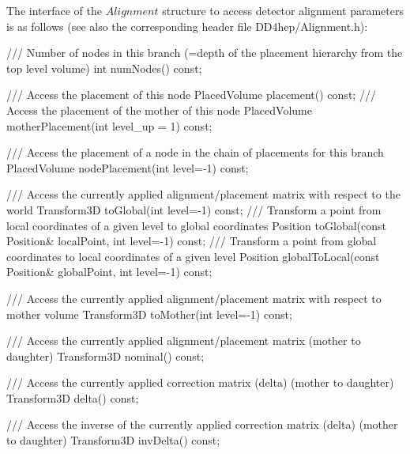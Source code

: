 \documentclass[10pt,a4paper]{article}
\begin{document}
\noindent
The interface of the $Alignment$ structure to access detector 
alignment parameters is as follows (see also the corresponding header file DD4hep/Alignment.h):
\begin{code}
      /// Number of nodes in this branch (=depth of the placement hierarchy from the top level volume)
      int numNodes() const;
      
      /// Access the placement of this node
      PlacedVolume placement()   const;
      /// Access the placement of the mother of this node
      PlacedVolume motherPlacement(int level_up = 1)   const;

      /// Access the placement of a node in the chain of placements for this branch
      PlacedVolume nodePlacement(int level=-1)   const;

      /// Access the currently applied alignment/placement matrix with respect to the world
      Transform3D toGlobal(int level=-1) const;
      /// Transform a point from local coordinates of a given level to global coordinates
      Position toGlobal(const Position& localPoint, int level=-1) const;
      /// Transform a point from global coordinates to local coordinates of a given level
      Position globalToLocal(const Position& globalPoint, int level=-1) const;

      /// Access the currently applied alignment/placement matrix with respect to mother volume
      Transform3D toMother(int level=-1) const;

      /// Access the currently applied alignment/placement matrix (mother to daughter)
      Transform3D nominal() const;

      /// Access the currently applied correction matrix (delta) (mother to daughter)
      Transform3D delta() const;

      /// Access the inverse of the currently applied correction matrix (delta) (mother to daughter)
      Transform3D invDelta() const;
\end{code}
\end{document}
